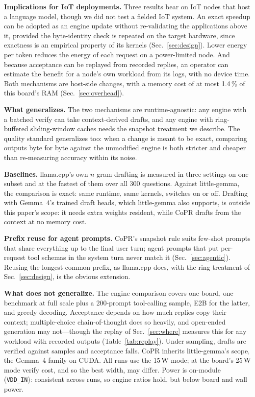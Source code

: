 \documentclass[lettersize,journal]{IEEEtran}
\newcommand{\sys}{CoPR}
\newcommand{\lc}{llama.cpp}
\newcommand{\lgm}{little-gemma}
\begin{document}
\textbf{Implications for IoT deployments.} Three results bear on IoT nodes
that host a language model, though we did not test a fielded IoT system. An
exact speedup can be adopted as an engine update without re-validating the
applications above it, provided the byte-identity check is repeated on the
target hardware, since exactness is an empirical property of its kernels
(Sec.~\ref{sec:design}). Lower energy per token reduces the energy of each
request on a power-limited node. And because acceptance can be replayed from
recorded replies, an operator can estimate the benefit for a node's own workload
from its logs, with no device time. Both mechanisms are host-side changes, with
a memory cost of at most 1.4\,\% of this board's RAM (Sec.~\ref{sec:overhead}).

\textbf{What generalizes.} The two mechanisms are runtime-agnostic: any engine
with a batched verify can take context-derived drafts, and any engine with
ring-buffered sliding-window caches needs the snapshot treatment we describe.
The quality standard generalizes too: when a change is meant to be exact,
comparing outputs byte for byte against the unmodified engine is both stricter
and cheaper than re-measuring accuracy within its noise.

\textbf{Baselines.} \lc{}'s own $n$-gram drafting is measured in three
settings on one subset and at the fastest of them over all 300 questions.
Against \lgm{}, the comparison is exact: same runtime, same kernels, switches
on or off. Drafting with Gemma~4's trained draft heads, which \lgm{} also supports, is
outside this paper's scope: it needs extra weights resident, while \sys{}
drafts from the context at no memory cost.

\textbf{Prefix reuse for agent prompts.} \sys{}'s snapshot rule suits
few-shot prompts that share everything up to the final user turn; agent
prompts that put per-request tool schemas in the system turn never match it
(Sec.~\ref{sec:agentic}). Reusing the longest common prefix, as \lc{} does,
with the ring treatment of Sec.~\ref{sec:design}, is the obvious extension.

\textbf{What does not generalize.} The engine comparison covers one board,
one benchmark at full scale plus a 200-prompt tool-calling sample, E2B for the
latter, and greedy decoding. Acceptance depends on how much replies copy their context;
multiple-choice chain-of-thought does so heavily, and open-ended generation may
not---though the replay of Sec.~\ref{sec:where} measures this for any workload
with recorded outputs (Table~\ref{tab:replay}). Under sampling, drafts are verified against samples and
acceptance falls. \sys{} inherits \lgm{}'s scope, the Gemma~4 family on CUDA.
All runs use the 15\,W mode; at the board's 25\,W mode verify cost, and so the
best width, may differ. Power is on-module (\texttt{VDD\_IN}): consistent across runs, so
engine ratios hold, but below board and wall power.
\end{document}
